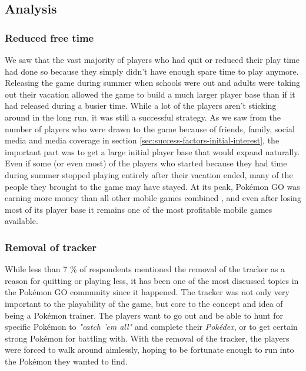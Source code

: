 \subsection{Analysis}
\label{sec:success-factors-quitting-analysis}

\subsubsection{Reduced free time}
\label{sec:reduced-free-time}
We saw that the vast majority of players who had quit or reduced their play time had done so because they simply didn't have enough spare time to play anymore. Releasing the game during summer when schools were out and adults were taking out their vacation allowed the game to build a much larger player base than if it had released during a busier time. While a lot of the players aren't sticking around in the long run, it was still a successful strategy. As we saw from the number of players who were drawn to the game because of friends, family, social media and media coverage in section \ref{sec:success-factors-initial-interest}, the important part was to get a large initial player base that would expand naturally. Even if some (or even most) of the players who started because they had time during summer stopped playing entirely after their vacation ended, many of the people they brought to the game may have stayed. At its peak, Pokémon GO was earning more money than all other mobile games combined , and even after losing most of its player base it remains one of the most profitable mobile games available. 

\subsubsection{Removal of tracker}
While less than 7 \% of respondents mentioned the removal of the tracker as a reason for quitting or playing less, it has been one of the most discussed topics in the Pokémon GO community since it happened. The tracker was not only very important to the playability of the game, but core to the concept and idea of being a Pokémon trainer. The players want to go out and be able to hunt for specific Pokémon to \emph{"catch 'em all"} and complete their \emph{Pokédex}, or to get certain strong Pokémon for battling with. With the removal of the tracker, the players were forced to walk around aimlessly, hoping to be fortunate enough to run into the Pokémon they wanted to find.

